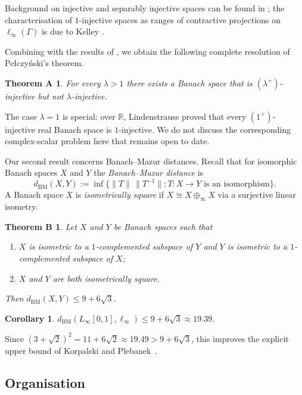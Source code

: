 \documentclass[11pt]{amsart}
\renewcommand{\le}{\leqslant}
\theoremstyle{definition}
\theoremstyle{remark}
\theoremstyle{plain}
\newtheorem*{theoremA}{Theorem A}
\newtheorem*{theoremB}{Theorem B}
\newtheorem*{corollarystar}{Corollary}
\numberwithin{equation}{section}
\newcommand{\R}{\mathbb{R}}
\newcommand{\BM}{\mathrm{BM}}
\newcommand{\dist}{d_{\BM}}
\begin{document}
Background on injective and separably injective spaces can be found
in \cite{AvilesCabelloCastilloGonzalezMoreno}; the characterisation
of $1$-injective spaces as ranges of contractive projections on
$\ell_\infty(\Gamma)$ is due to Kelley \cite{Kelley}.

Combining with the results of \cite{KaniaLewicki}, we obtain the
following complete resolution of Pe{\l}czy\'nski's theorem.

\begin{theoremA}
For every $\lambda>1$ there exists a Banach space that is
$(\lambda^+)$-injective but not $\lambda$-injective.
\end{theoremA}

The case $\lambda=1$ is special: over $\R$, Lindenstrauss
\cite{Lindenstrauss} proved that every $(1^+)$-injective real Banach
space is $1$-injective.  We do not discuss the corresponding
complex-scalar problem here that remains open to date.

Our second result concerns Banach--Mazur distances.
Recall that for isomorphic Banach spaces $X$ and $Y$ the
\emph{Banach--Mazur distance} is
\[
\dist(X,Y)
:=\inf\{\|T\|\,\|T^{-1}\|: T\colon X\to Y\text{ is an isomorphism}\}.
\]
A Banach space $X$ is \emph{isometrically square} if
$X\cong X\oplus_\infty X$ via a surjective linear isometry.

\begin{theoremB}
Let $X$ and $Y$ be Banach spaces such that
\begin{enumerate}[label=\textup{(\roman*)}]
\item $X$ is isometric to a $1$-complemented subspace of $Y$ and
$Y$ is isometric to a $1$-complemented subspace of $X$;
\item $X$ and $Y$ are both isometrically square.
\end{enumerate}
Then $\dist(X,Y)\le 9+6\sqrt{3}$.
\end{theoremB}

\begin{corollarystar}
$\dist(L_\infty[0,1],\ell_\infty)\le 9+6\sqrt{3}\approx 19.39$.
\end{corollarystar}

Since $(3+\sqrt{2})^2=11+6\sqrt{2}\approx 19.49 > 9+6\sqrt{3}$, this
improves the explicit upper bound of Korpalski and
Plebanek~\cite{KorpalskiPlebanek}.

\subsection*{Organisation}
\end{document}

